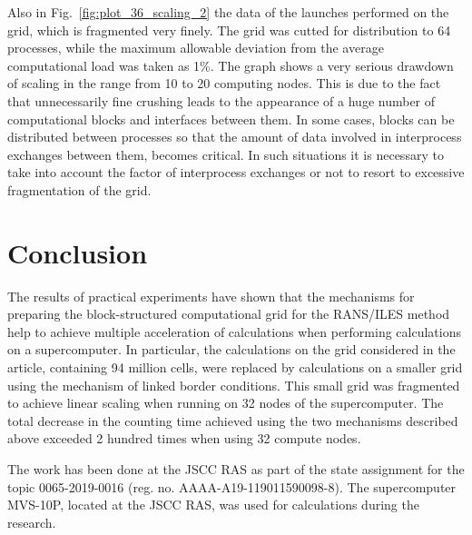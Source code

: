 \documentclass[
11pt,%
tightenlines,%
twoside,%
onecolumn,%
nofloats,%
nobibnotes,%
nofootinbib,%
superscriptaddress,%
noshowpacs,%
centertags]%
{revtex4}
\begin{document}
Also in Fig.~\ref{fig:plot_36_scaling_2} the data of the  launches
performed on the grid, which is fragmented very finely. The grid was
cutted for distribution to 64 processes, while the maximum allowable
deviation from the average computational load was taken as 1\%. The
graph shows a very serious drawdown of scaling in the range from 10
to 20 computing nodes. This is due to the fact that unnecessarily
fine crushing leads to the appearance of a huge number of
computational blocks and interfaces between them. In some cases,
blocks can be distributed between processes so that the amount of
data involved in interprocess exchanges between them, becomes
critical. In such situations it is necessary to take into account
the factor of interprocess exchanges or not to resort to excessive
fragmentation of the grid.

\section{Conclusion}

The results of practical experiments have shown that the  mechanisms
for preparing the block-structured computational grid for the
RANS/ILES method help to achieve multiple acceleration of
calculations when performing calculations on a supercomputer. In
particular, the calculations on the grid considered in the article,
containing 94 million cells, were replaced by calculations on a
smaller grid using the mechanism of linked border conditions. This
small grid was fragmented to achieve linear scaling when running on
32 nodes of the supercomputer. The total decrease in the counting
time achieved using the two mechanisms described above exceeded 2
hundred times when using 32 compute nodes.

\begin{acknowledgments}
The work has been done at the JSCC RAS as part of the state assignment for the topic 0065-2019-0016 (reg. no. AAAA-A19-119011590098-8). The supercomputer MVS-10P, located at the JSCC RAS, was used for calculations during the research.
\end{acknowledgments}
\end{document}
